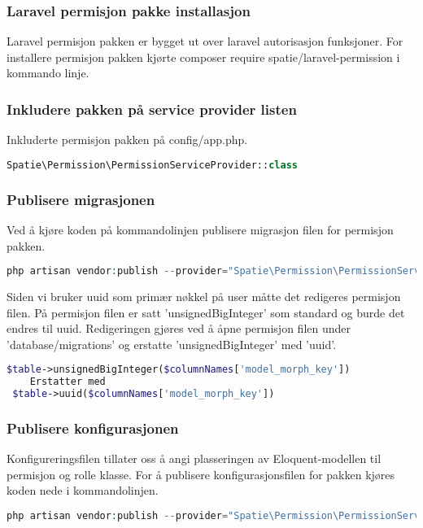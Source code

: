 \subsubsection{Laravel permisjon pakke installasjon} 
Laravel permisjon pakken er bygget ut over laravel autorisasjon funksjoner\cite{laravelnewsn2017tblp}.
For installere permisjon pakken kjørte composer require spatie/laravel-permission i kommando linje.

\subsubsection{Inkludere pakken på service provider listen}
Inkluderte permisjon pakken på config/app.php. 
\begin{lstlisting}[language=PHP]
    Spatie\Permission\PermissionServiceProvider::class
\end{lstlisting}

\subsubsection{Publisere migrasjonen}
Ved å kjøre koden på kommandolinjen publisere migrasjon filen for permisjon pakken.
\begin{lstlisting}[language=PHP]
   php artisan vendor:publish --provider="Spatie\Permission\PermissionServiceProvider" --tag="migrations" 
\end{lstlisting}

Siden vi bruker uuid som primær nøkkel på user måtte det redigeres permisjon filen. På permisjon filen er satt 'unsignedBigInteger' som standard og burde det  endres  til uuid. Redigeringen gjøres ved å åpne permisjon filen  under 'database/migrations' og erstatte 'unsignedBigInteger' med 'uuid'.
\begin{lstlisting}[language=PHP]
  $table->unsignedBigInteger($columnNames['model_morph_key'])
    Erstatter med 
 $table->uuid($columnNames['model_morph_key'])
\end{lstlisting}

\subsubsection{Publisere konfigurasjonen}
Konfigureringsfilen tillater oss å angi plasseringen av Eloquent-modellen til permisjon og rolle klasse.
For å publisere konfigurasjonsfilen for pakken kjøres koden nede i kommandolinjen.

\begin{lstlisting}[language=PHP]
  php artisan vendor:publish --provider="Spatie\Permission\PermissionServiceProvider" --tag="config"
\end{lstlisting}

